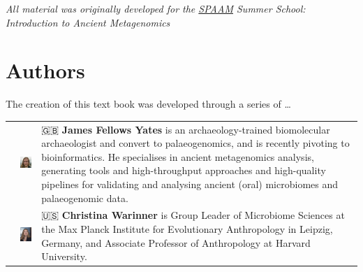 \documentclass[
  letterpaper,
]{book}
\begin{document}
\emph{All material was originally developed for the
\href{https://spaam-community-github.io}{SPAAM} Summer School:
Introduction to Ancient Metagenomics}


\hypertarget{authors}{%
\chapter*{Authors}\label{authors}}


The creation of this text book was developed through a series of
\ldots{}

\begin{longtable}[]{@{}
  >{\raggedright\arraybackslash}p{}
  >{\centering\arraybackslash}p{}
  >{\raggedright\arraybackslash}p{}@{}}
\toprule\noalign{}
\endhead
\bottomrule\noalign{}
\endlastfoot
2022 &
\includegraphics[width=1.04167in,height=\textheight]{assets/images/headshots/FELLOWS_YATES_James.jpg}
& 🇬🇧 \textbf{James Fellows Yates} is an archaeology-trained biomolecular
archaeologist and convert to palaeogenomics, and is recently pivoting to
bioinformatics. He specialises in ancient metagenomics analysis,
generating tools and high-throughput approaches and high-quality
pipelines for validating and analysing ancient (oral) microbiomes and
palaeogenomic data. \\
2022 &
\includegraphics[width=1.04167in,height=\textheight]{assets/images/headshots/WARINNER_Christina.png}
& 🇺🇸 \textbf{Christina Warinner} is Group Leader of Microbiome Sciences
at the Max Planck Institute for Evolutionary Anthropology in Leipzig,
Germany, and Associate Professor of Anthropology at Harvard University.

\end{longtable}
\end{document}
